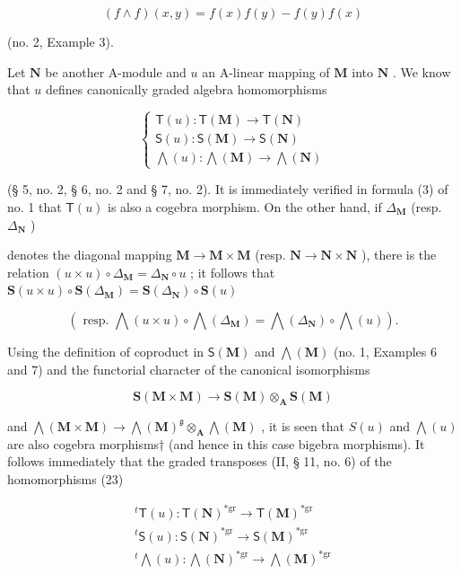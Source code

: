 \[
(f \wedge f) (x, y) = f (x) f (y) - f (y) f (x)
\]

(no. 2, Example 3).

Let \(\mathbf{N}\) be another A-module and \(u\) an A-linear mapping of \(\mathbf{M}\) into \(\mathbf{N}\) . We know that \(u\) defines canonically graded algebra homomorphisms

\[
\left\{ \begin{array}{l} \mathsf {T} (u): \mathsf {T} (\mathbf {M}) \to \mathsf {T} (\mathbf {N}) \\ \mathsf {S} (u): \mathsf {S} (\mathbf {M}) \to \mathsf {S} (\mathbf {N}) \\ \bigwedge (u): \bigwedge (\mathbf {M}) \to \bigwedge (\mathbf {N}) \end{array} \right.\tag{23}
\]

(§ 5, no. 2, § 6, no. 2 and § 7, no. 2). It is immediately verified in formula (3) of no. 1 that \(\mathsf{T}(u)\) is also a cogebra morphism. On the other hand, if \(\Delta_{\mathbf{M}}\) (resp. \(\Delta_{\mathbf{N}}\) )

denotes the diagonal mapping \(\mathbf{M} \to \mathbf{M} \times \mathbf{M}\) (resp. \(\mathbf{N} \to \mathbf{N} \times \mathbf{N}\) ), there is the relation \((u \times u) \circ \Delta_{\mathbf{M}} = \Delta_{\mathbf{N}} \circ u\) ; it follows that \(\mathbf{S}(u \times u) \circ \mathbf{S}(\Delta_{\mathbf{M}}) = \mathbf{S}(\Delta_{\mathbf{N}}) \circ \mathbf{S}(u)\)

\[
(\text { resp. } \bigwedge (u \times u) \circ \bigwedge (\Delta_ {\mathbf {M}}) = \bigwedge (\Delta_ {\mathbf {N}}) \circ \bigwedge (u)).
\]

Using the definition of coproduct in \(\mathsf{S}(\mathbf{M})\) and \(\bigwedge (\mathbf{M})\) (no. 1, Examples 6 and 7) and the functorial character of the canonical isomorphisms

\[
\mathbf {S} (\mathbf {M} \times \mathbf {M}) \rightarrow \mathbf {S} (\mathbf {M}) \otimes_ {\mathbf {A}} \mathbf {S} (\mathbf {M})
\]

and \(\bigwedge (\mathbf{M}\times \mathbf{M})\to \bigwedge (\mathbf{M})^{\mathfrak{g}}\otimes_{\mathbf{A}}\bigwedge (\mathbf{M})\) , it is seen that \(S(u)\) and \(\bigwedge (u)\) are also cogebra morphisms† (and hence in this case bigebra morphisms). It follows immediately that the graded transposes (II, § 11, no. 6) of the homomorphisms (23)

\[
\begin{array}{c} ^ {t} \mathsf {T} (u): \mathsf {T} (\mathbf {N}) ^ {* \mathrm{gr}} \to \mathsf {T} (\mathbf {M}) ^ {* \mathrm{gr}} \\ ^ {t} \mathsf {S} (u): \mathsf {S} (\mathbf {N}) ^ {* \mathrm{gr}} \to \mathsf {S} (\mathbf {M}) ^ {* \mathrm{gr}} \\ ^ {t} \bigwedge (u): \bigwedge (\mathbf {N}) ^ {* \mathrm{gr}} \to \bigwedge (\mathbf {M}) ^ {* \mathrm{gr}} \end{array}
\]

